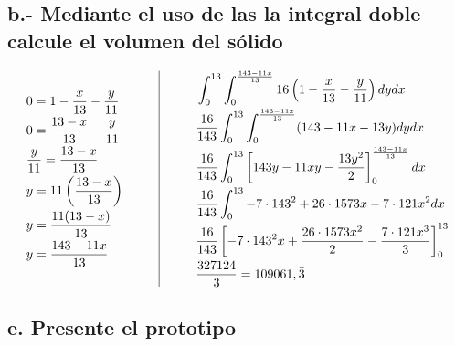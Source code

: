 \subsection*{b.- Mediante el uso de las la integral doble calcule el
volumen del sólido}
\vspace{-1cm}
\begin{center}
  \[
    \begin{array}{c@{\hspace{1cm}}|@{\hspace{1cm}}c}
      \begin{aligned}
        &0 = 1 - \frac{x}{13} - \frac{y}{11} \\
        &0 = \frac{13 - x}{13} - \frac{y}{11} \\
        &\frac{y}{11} = \frac{13 - x}{13} \\
        &y = 11 \left(\frac{13 - x}{13}\right) \\
        &y = \frac{11(13 - x)}{13} \\
        &y = \frac{143 - 11x}{13}
      \end{aligned}
      &
      \begin{aligned}
        &\int_{0}^{13} \int_{0}^{\frac{143-11x}{13}} 16 \left(1 -
        \frac{x}{13} - \frac{y}{11}\right) dy dx \\
        &\frac{16}{143} \int_{0}^{13} \int_{0}^{\frac{143-11x}{13}}
        (143 - 11x - 13y) dy dx \\
        &\frac{16}{143} \int_{0}^{13} \left[ 143y - 11xy -
        \frac{13y^2}{2} \right]_{0}^{\frac{143-11x}{13}} dx \\
        &\frac{16}{143} \int_{0}^{13} -7 \cdot 143^2 + 26 \cdot 1573x
        - 7 \cdot 121x^2 dx \\
        &\frac{16}{143} \left[ -7 \cdot 143^2x + \frac{26 \cdot
        1573x^2}{2} - \frac{7 \cdot 121 x^3}{3} \right]_{0}^{13} \\
        &\frac{327124}{3} = 109061,\bar{3}
      \end{aligned}
    \end{array}
  \]
\end{center}

\subsection*{e. Presente el prototipo}
\begin{center}
\end{center}
